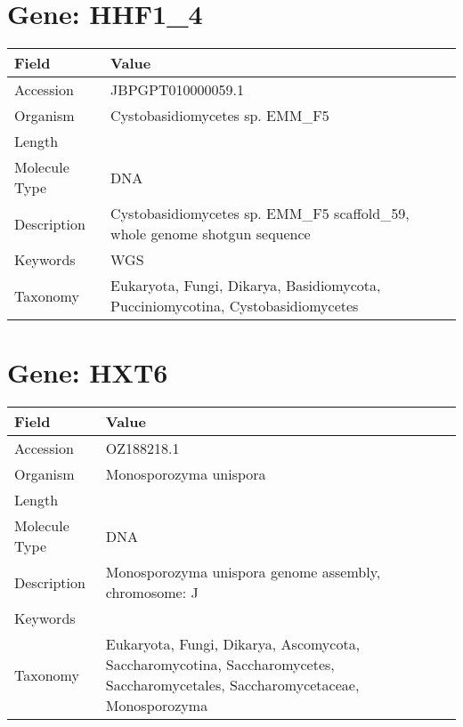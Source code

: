 \documentclass[10pt]{article}
\begin{document}
\section{Gene: HHF1\_4}
{\footnotesize
\begin{longtable}{>{\raggedright\arraybackslash}p{4.5cm} >{\raggedright\arraybackslash}p{11.5cm}}
\textbf{Field} & \textbf{Value} \\
\hline
Accession & JBPGPT010000059.1 \\
Organism & Cystobasidiomycetes sp. EMM\_F5 \\
Length & 52126 \\
Molecule Type & DNA \\
Description & Cystobasidiomycetes sp. EMM\_F5 scaffold\_59, whole genome shotgun sequence \\
Keywords & WGS \\
Taxonomy & Eukaryota, Fungi, Dikarya, Basidiomycota, Pucciniomycotina, Cystobasidiomycetes \\
\end{longtable}
}

\vspace{1em}
\section{Gene: HXT6}
{\footnotesize
\begin{longtable}{>{\raggedright\arraybackslash}p{4.5cm} >{\raggedright\arraybackslash}p{11.5cm}}
\textbf{Field} & \textbf{Value} \\
\hline
Accession & OZ188218.1 \\
Organism & Monosporozyma unispora \\
Length & 919729 \\
Molecule Type & DNA \\
Description & Monosporozyma unispora genome assembly, chromosome: J \\
Keywords &  \\
Taxonomy & Eukaryota, Fungi, Dikarya, Ascomycota, Saccharomycotina, Saccharomycetes, Saccharomycetales, Saccharomycetaceae, Monosporozyma \\
\end{longtable}
}

\vspace{1em}
\end{document}
